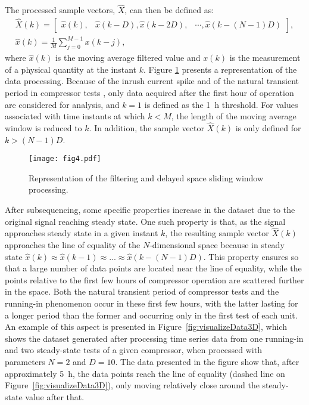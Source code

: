 \documentclass[preprint,11pt,number]{elsarticle}
\begin{document}
The processed sample vectors, $\hat{X}$, can then be defined as:
\begin{equation} \label{eq:vectorSliding}
    \begin{gathered}
    \hat{X}(k) = \left[\begin{matrix} 
    \hat{x}(k), & \hat{x}(k-D), \hat{x}(k-2D), & \cdots,\hat{x}(k-(N-1)D)
    \end{matrix}\right], \\
    \hat{x}(k) = \frac{1}{M}\sum\limits_{j=0}^{M-1} x(k-j),
\end{gathered}
\end{equation}
%
\noindent where $\hat{x}(k)$ is the moving average filtered value and $x(k)$ is the measurement of a physical quantity at the instant $k$. Figure \ref{fig:dataProcess} presents a representation of the data processing. Because of the inrush current spike and of the natural transient period in compressor tests \cite{Coral2019}, only data acquired after the first hour of operation are considered for analysis, and $k = 1$ is defined as the \SI{1}{\hour} threshold. For values associated with time instants at which $k<M$, the length of the moving average window is reduced to $k$. In addition, the sample vector $\hat{X}(k)$ is only defined for $k>(N-1)D$.

\begin{figure}[htb]
\begin{center}
\texttt{[image: fig4.pdf]}    %
\caption{Representation of the filtering and delayed space sliding window processing.}
\label{fig:dataProcess}
\end{center}
\end{figure}

After subsequencing, some specific properties increase in the dataset due to the original signal reaching steady state. One such property is that, as the signal approaches steady state in a given instant $k$, the resulting sample vector $\hat{X}(k)$ approaches the line of equality of the $N$-dimensional space because in steady state $\hat{x}(k) \approx \hat{x}(k-1) \approx ... \approx \hat{x}(k-(N-1)D)$. This property ensures so that a large number of data points are located near the line of equality, while the points relative to the first few hours of compressor operation are scattered further in the space. Both the natural transient period of compressor tests and the running-in phenomenon occur in these first few hours, with the latter lasting for a longer period than the former and occurring only in the first test of each unit. An example of this aspect is presented in Figure~\ref{fig:visualizeData3D}, which shows the dataset generated after processing time series data from one running-in and two steady-state tests of a given compressor, when processed with parameters $N=2$ and $D=10$. The data presented in the figure show that, after approximately \SI{5}{\hour}, the data points reach the line of equality (dashed line on Figure~\ref{fig:visualizeData3D}), only moving relatively close around the steady-state value after that.
\end{document}
